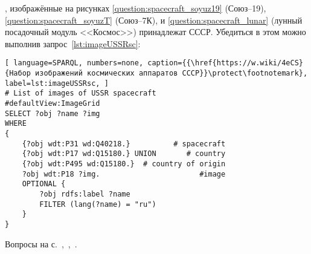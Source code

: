 \begin{task}
    \label{answer:spacecraft_USSR}
    , изображённые на рисунках \ref{question:spacecraft_soyuz19} (Союз--19), \ref{question:spacecraft_soyuzT} (Союз--7К), и \ref{question:spacecraft_lunar} (лунный посадочный модуль <<Космос>>) принадлежат СССР. Убедиться в этом можно выполнив запрос~\ref{lst:imageUSSRsc}:
    \begin{lstlisting}[ language=SPARQL, numbers=none, caption={{\href{https://w.wiki/4eCS}{Набор изображений космических аппаратов СССР}}\protect\footnotemark}, label=lst:imageUSSRsc, ]
# List of images of USSR spacecraft
#defaultView:ImageGrid
SELECT ?obj ?name ?img
WHERE
{
    {?obj wdt:P31 wd:Q40218.}          # spacecraft
    {?obj wdt:P17 wd:Q15180.} UNION       # country
    {?obj wdt:P495 wd:Q15180.}  # country of origin
    ?obj wdt:P18 ?img.                       #image
    OPTIONAL {
		?obj rdfs:label ?name 
		FILTER (lang(?name) = "ru")
	}
}    \end{lstlisting}

    \small{Вопросы на с.~\pageref{question:spacecraft_soyuz19},~\pageref{question:spacecraft_soyuzT},~\pageref{question:spacecraft_lunar}.}
\end{task}

